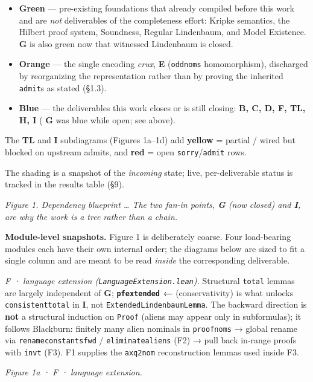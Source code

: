 \documentclass[11pt,a4paper]{article}
\renewcommand{\_}{\origtextunderscore\allowbreak}
\begin{document}
\begin{itemize}
\item
  \textbf{Green} --- pre-existing foundations that already compiled before this work and are \emph{not} deliverables of the completeness effort: Kripke semantics, the Hilbert proof system, Soundness, Regular Lindenbaum, and Model Existence. \textbf{G} is also green now that witnessed Lindenbaum is closed.
\item
  \textbf{Orange} --- the single encoding \emph{crux}, \textbf{E} (\texttt{odd\_noms} homomorphism), discharged by reorganizing the representation rather than by proving the inherited \texttt{admit}s as stated (§1.3).
\item
  \textbf{Blue} --- the deliverables this work closes or is still closing: \textbf{B, C, D, F, TL, H, I} ( \textbf{G} was blue while open; see above).
\end{itemize}

The \textbf{TL} and \textbf{I} subdiagrams (Figures 1a--1d) add \textbf{yellow} = partial / wired but blocked on upstream admits, and \textbf{red} = open \texttt{sorry}/\texttt{admit} rows.

The shading is a snapshot of the \emph{incoming} state; live, per-deliverable status is tracked in the results table (§9).

\emph{Figure 1. Dependency blueprint \ldots{} The two fan-in points, \textbf{G} (now closed) and \textbf{I}, are why the work is a tree rather than a chain.}

\textbf{Module-level snapshots.} Figure 1 is deliberately coarse. Four load-bearing modules each have their own internal order; the diagrams below are sized to fit a single column and are meant to be read \emph{inside} the corresponding deliverable.

\emph{F · language extension (\texttt{LanguageExtension.lean}).} Structural \texttt{total\_*} lemmas are largely independent of \textbf{G}; \textbf{\texttt{pf\_extended} ←} (conservativity) is what unlocks \texttt{consistent\_total} in \textbf{I}, not \texttt{ExtendedLindenbaumLemma}. The backward direction is \textbf{not} a structural induction on \texttt{Proof} (aliens may appear only in subformulas); it follows Blackburn: finitely many alien nominals in \texttt{proof\_noms} → global rename via \texttt{rename\_constants\_fwd} / \texttt{eliminate\_aliens} (F2) → pull back in-range proofs with \texttt{inv\_t} (F3). F1 supplies the \texttt{ax\_q2\_nom} reconstruction lemmas used inside F3.

\emph{Figure 1a · F · language extension.}
\end{document}
